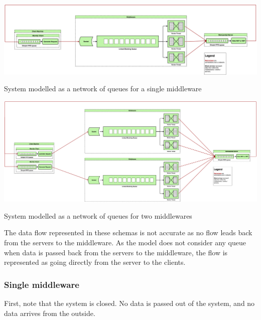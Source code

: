 \documentclass[11pt,a4paper]{article}
\begin{document}
\begin{SidewaysFigure}
    \centering
    \begin{minipage}[b]{0.9\paperheight}
        \centering
        \includegraphics[width=0.65\paperheight]{processing/graphics/network_queues_1mw.png}
        \caption{System modelled as a network of queues for a single middleware}
        \label{png::network_queues_1mw}
    \end{minipage}

    \hfill
    \vspace*{1cm}

    \begin{minipage}[b]{0.9\paperheight}
        \centering
        \includegraphics[width=0.65\paperheight]{processing/graphics/network_queues_2mw.png}
        \caption{System modelled as a network of queues for two middlewares}
        \label{png::network_queues_2mw}
    \end{minipage}
\end{SidewaysFigure}



The data flow represented in these schemas is not accurate as no flow leads back from the servers to the middleware. As the model does not consider any queue when data is passed back from the servers to the middleware, the flow is represented as going directly from the server to the clients.

\subsubsection{Single middleware}
First, note that the system is closed. No data is passed out of the system, and no data arrives from the outside.
\end{document}
